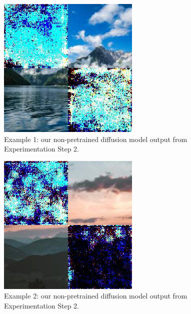 \documentclass[sigconf]{acmart}
\begin{document}
\begin{figure}[h!]
    \centering
    \includegraphics[width=\linewidth]{diffusion_step_2_1}
    \caption{Example 1: our non-pretrained diffusion model output from Experimentation Step 2.}
    \label{fig:diffusion_step_2_1}
\end{figure}

\begin{figure}[h!]
    \centering
    \includegraphics[width=\linewidth]{diffusion_step_2_2}
    \caption{Example 2: our non-pretrained diffusion model output from Experimentation Step 2.}
    \label{fig:diffusion_step_2_2}
\end{figure}
\end{document}
